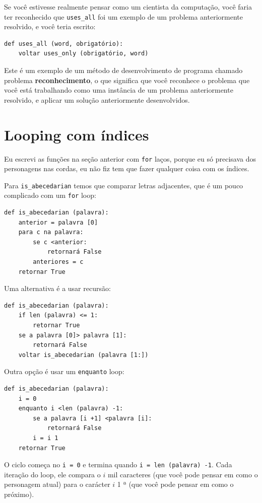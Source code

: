 \documentclass[10pt]{book}
\begin{document}
\begin{exercise}
Se você estivesse realmente pensar como um cientista da computação, você faria
ter reconhecido que \verb "uses_all" foi um exemplo de um
problema anteriormente resolvido, e você teria escrito:

\begin{verbatim}
def uses_all (word, obrigatório):
    voltar uses_only (obrigatório, word)
\end{verbatim}
%
Este é um exemplo de um método de desenvolvimento de programa chamado problema {\bf
reconhecimento}, o que significa que você reconhece o problema que você está
trabalhando como uma instância de um problema anteriormente resolvido, e aplicar um
solução anteriormente desenvolvidos.


\section{Looping com índices}

Eu escrevi as funções na seção anterior com {\tt for}
laços, porque eu só precisava dos personagens nas cordas, eu não fiz
tem que fazer qualquer coisa com os índices.

Para \verb "is_abecedarian" temos que comparar letras adjacentes,
que é um pouco complicado com um {\tt for} loop:

\begin{verbatim}
def is_abecedarian (palavra):
    anterior = palavra [0]
    para c na palavra:
        se c <anterior:
            retornará False
        anteriores = c
    retornar True
\end{verbatim}


Uma alternativa é a
usar recursão:

\begin{verbatim}
def is_abecedarian (palavra):
    if len (palavra) <= 1:
        retornar True
    se a palavra [0]> palavra [1]:
        retornará False
    voltar is_abecedarian (palavra [1:])
\end{verbatim}

Outra opção é usar um {\tt enquanto} loop:

\begin{verbatim}
def is_abecedarian (palavra):
    i = 0
    enquanto i <len (palavra) -1:
        se a palavra [i +1] <palavra [i]:
            retornará False
        i = i 1
    retornar True
\end{verbatim}
%
O ciclo começa no {\tt i = 0} e termina quando {\tt i = len (palavra) -1}. Cada
iteração do loop, ele compara o $ i $ mil caracteres (que você pode
pensar em como o personagem atual) para o carácter $ i $ 1 ª (que você
pode pensar em como o próximo).


\end{exercise}
\end{document}
